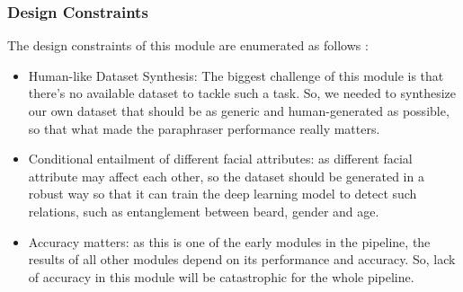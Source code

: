 \subsubsection{Design Constraints}
The design constraints of this module are enumerated as follows :
\begin{itemize}
    \item Human-like Dataset Synthesis: The biggest challenge of this module is that there’s no available dataset to tackle such a task. So, we needed to synthesize our own dataset that should be as generic and human-generated as possible, so that what made the paraphraser performance really matters.
    \item Conditional entailment of different facial attributes: as different facial attribute may affect each other, so the dataset should be generated in a robust way so that it can train the deep learning model to detect such relations, such as entanglement between beard, gender and age.
    \item Accuracy matters: as this is one of the early modules in the pipeline, the results of all other modules depend on its performance and accuracy. So, lack of accuracy in this module will be catastrophic for the whole pipeline.
\end{itemize}

